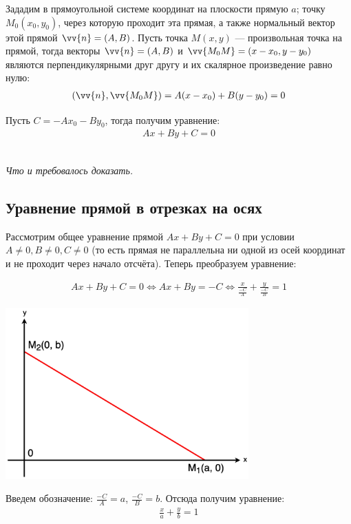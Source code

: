 \documentclass[a4paper,12pt,oneside]{extbook}
\newcommand{\newpar}{$ $\par\nobreak\ignorespaces}
\theoremstyle{numbered}
\theoremstyle{unnumbered}
\theoremstyle{named}
\theoremstyle{unnumbered}
\theoremstyle{named}
\theoremstyle{named}
\theoremstyle{named}
\renewenvironment{proof}[1][]{\breakenv[Доказательство]{\if\relax\detokenize{#1}\relax\else\;\fi}{\textbf{#1}}}{\smallskip\newpar \hfill\textit{Что и требовалось доказать.}}
\begin{document}
\begin{proof}
    Зададим в прямоугольной системе координат на плоскости прямую \(a \); точку \(M_0(x_0, y_0)\), через которую проходит эта прямая, а также нормальный вектор этой прямой \(\vv{n} = (A, B)\).
    Пусть точка \(M(x, y)\) — произвольная точка на прямой, тогда векторы \(\vv{n} = (A, B)\) и \(\vv{M_0M} = (x - x_0, y - y_0)\) являются перпендикулярными друг другу и их скалярное произведение равно нулю:
    \begin{gather*}
        (\vv{n}, \vv{M_0M}) = A(x - x_0) + B(y - y_0) = 0
    \end{gather*}

    Пусть \(C = -Ax_0 - By_0\), тогда получим уравнение:
    \begin{gather*}
        Ax + By + C = 0
    \end{gather*}
\end{proof}

\subsection{Уравнение прямой в отрезках на осях}

Рассмотрим общее уравнение прямой \(Ax + By + C = 0\) при условии \(A \neq 0, B \neq 0, C \neq 0\) (то есть прямая не параллельна ни одной из осей координат и не проходит через начало отсчёта).
Теперь преобразуем уравнение:

\begin{gather*}
    Ax + By + C = 0  \iff Ax + By = -C \iff \frac{x}{\frac{-C}{A}} + \frac{y}{\frac{-C}{B}} = 1
\end{gather*}

\begin{center}
    \includegraphics[width=0.7\textwidth]{axis_line.png}
\end{center}

Введем обозначение: \(\frac{-C}{A} = a\), \(\frac{-C}{B} = b\).
Отсюда получим уравнение:
\begin{gather*}
    \frac{x}{a} + \frac{y}{b} = 1
\end{gather*}
\end{document}
